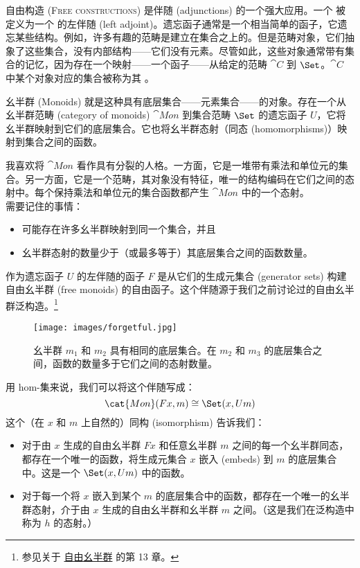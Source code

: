 
\lettrine[lhang=0.17]{自}{由构造 (Free constructions) 是}伴随 (adjunctions) 的一个强大应用。一个  被定义为一个  的左伴随 (left adjoint)。遗忘函子通常是一个相当简单的函子，它遗忘某些结构。例如，许多有趣的范畴是建立在集合之上的。但是范畴对象，它们抽象了这些集合，没有内部结构——它们没有元素。尽管如此，这些对象通常带有集合的记忆，因为存在一个映射——一个函子——从给定的范畴 $\cat{C}$ 到 $\Set$。$\cat{C}$ 中某个对象对应的集合被称为其 。

幺半群 (Monoids) 就是这种具有底层集合——元素集合——的对象。存在一个从幺半群范畴 (category of monoids) $\cat{Mon}$ 到集合范畴 $\Set$ 的遗忘函子 $U$，它将幺半群映射到它们的底层集合。它也将幺半群态射（同态 (homomorphisms)）映射到集合之间的函数。

我喜欢将 $\cat{Mon}$ 看作具有分裂的人格。一方面，它是一堆带有乘法和单位元的集合。另一方面，它是一个范畴，其对象没有特征，唯一的结构编码在它们之间的态射中。每个保持乘法和单位元的集合函数都产生 $\cat{Mon}$ 中的一个态射。\\
\newline
需要记住的事情：

\begin{itemize}
  \tightlist
  \item
        可能存在许多幺半群映射到同一个集合，并且
  \item
        幺半群态射的数量少于（或最多等于）其底层集合之间的函数数量。
\end{itemize}

\noindent
作为遗忘函子 $U$ 的左伴随的函子 $F$ 是从它们的生成元集合 (generator sets) 构建自由幺半群 (free monoids) 的自由函子。这个伴随源于我们之前讨论过的自由幺半群泛构造。\footnote{参见关于 \hyperref[free-monoids]{自由幺半群} 的第 13 章。}

\begin{figure}[H]
  \centering
  \texttt{[image: images/forgetful.jpg]}
  \caption{幺半群 $m_1$ 和 $m_2$ 具有相同的底层集合。在 $m_2$ 和 $m_3$ 的底层集合之间，函数的数量多于它们之间的态射数量。}
\end{figure}

\noindent
用 hom-集来说，我们可以将这个伴随写成：
\[\cat{Mon}(F x, m) \cong \Set(x, U m)\]
这个（在 $x$ 和 $m$ 上自然的）同构 (isomorphism) 告诉我们：

\begin{itemize}
  \tightlist
  \item
        对于由 $x$ 生成的自由幺半群 $F x$ 和任意幺半群 $m$ 之间的每一个幺半群同态，都存在一个唯一的函数，将生成元集合 $x$ 嵌入 (embeds) 到 $m$ 的底层集合中。这是一个 $\Set(x, U m)$ 中的函数。
  \item
        对于每一个将 $x$ 嵌入到某个 $m$ 的底层集合中的函数，都存在一个唯一的幺半群态射，介于由 $x$ 生成的自由幺半群和幺半群 $m$ 之间。（这是我们在泛构造中称为 $h$ 的态射。）
\end{itemize}

